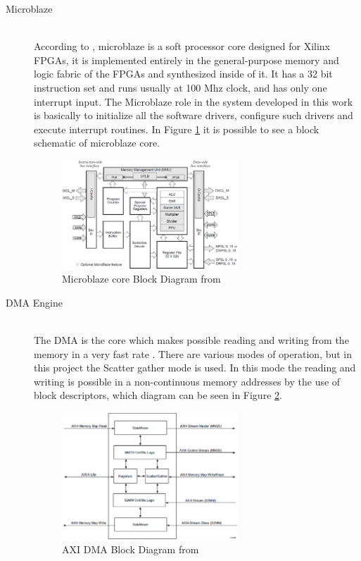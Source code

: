 \begin{description}

	\item[Microblaze] \hfill \\

  According to \cite{xilinx:ublaze}, microblaze is a soft processor core
  designed for Xilinx FPGAs, it is implemented entirely in the general-purpose
  memory and logic fabric of the FPGAs and synthesized inside of it. It has a 32
  bit instruction set and runs usually at 100 Mhz clock, and has only one
  interrupt input. The Microblaze role in the system developed in this work is
  basically to initialize all the software drivers, configure such drivers and
  execute interrupt routines. In Figure \ref{fig:mbbd} it is possible to see a
  block schematic of microblaze core.

  \begin{figure}[htbp]
    \centering
    \includegraphics[width=0.65\textwidth]{./figures/mb_bd}
    \caption{ Microblaze core Block Diagram from \cite{xilinx:ublaxe}
    \label{fig:mbbd}}
  \end{figure}

	\item[DMA Engine] \hfill \\

  The DMA is the core which makes possible reading and writing from the memory
  in a very fast rate \cite{xilinx:axidma}. There are various modes of
  operation, but in this project the Scatter gather mode is used. In this mode
  the reading and writing is possible in a non-continuous memory addresses by
  the use of block descriptors, which diagram can be seen in Figure
  \ref{fig:dmabd}.

  \begin{figure}[htbp]
    \centering
    \includegraphics[width=0.65\textwidth]{./figures/dma_bd}
    \caption{ AXI DMA Block Diagram from \cite{xilinx:axidma}
    \label{fig:dmabd}}
  \end{figure}


\end{description}
